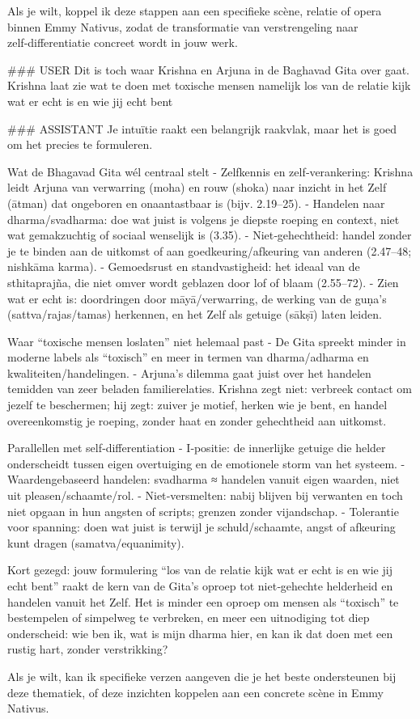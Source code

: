Als je wilt, koppel ik deze stappen aan een specifieke scène, relatie of opera binnen Emmy Nativus, zodat de transformatie van verstrengeling naar zelf‑differentiatie concreet wordt in jouw werk.

\#\#\# USER
Dit is toch waar Krishna en Arjuna in de Baghavad Gita over gaat. Krishna laat zie wat te doen met toxische mensen namelijk los van de relatie kijk wat er echt is en wie jij echt bent

\#\#\# ASSISTANT
Je intuïtie raakt een belangrijk raakvlak, maar het is goed om het precies te formuleren.

Wat de Bhagavad Gita wél centraal stelt
- Zelfkennis en zelf‑verankering: Krishna leidt Arjuna van verwarring (moha) en rouw (shoka) naar inzicht in het Zelf (ātman) dat ongeboren en onaantastbaar is (bijv. 2.19–25).
- Handelen naar dharma/svadharma: doe wat juist is volgens je diepste roeping en context, niet wat gemakzuchtig of sociaal wenselijk is (3.35).
- Niet‑gehechtheid: handel zonder je te binden aan de uitkomst of aan goedkeuring/afkeuring van anderen (2.47–48; nishkāma karma).
- Gemoedsrust en standvastigheid: het ideaal van de sthitaprajña, die niet omver wordt geblazen door lof of blaam (2.55–72).
- Zien wat er echt is: doordringen door māyā/verwarring, de werking van de guṇa’s (sattva/rajas/tamas) herkennen, en het Zelf als getuige (sākṣī) laten leiden.

Waar “toxische mensen loslaten” niet helemaal past
- De Gita spreekt minder in moderne labels als “toxisch” en meer in termen van dharma/adharma en kwaliteiten/handelingen.
- Arjuna’s dilemma gaat juist over het handelen temidden van zeer beladen familierelaties. Krishna zegt niet: verbreek contact om jezelf te beschermen; hij zegt: zuiver je motief, herken wie je bent, en handel overeenkomstig je roeping, zonder haat en zonder gehechtheid aan uitkomst.

Parallellen met self‑differentiation
- I‑positie: de innerlijke getuige die helder onderscheidt tussen eigen overtuiging en de emotionele storm van het systeem.
- Waardengebaseerd handelen: svadharma ≈ handelen vanuit eigen waarden, niet uit pleasen/schaamte/rol.
- Niet‑versmelten: nabij blijven bij verwanten en toch niet opgaan in hun angsten of scripts; grenzen zonder vijandschap.
- Tolerantie voor spanning: doen wat juist is terwijl je schuld/schaamte, angst of afkeuring kunt dragen (samatva/equanimity).

Kort gezegd: jouw formulering “los van de relatie kijk wat er echt is en wie jij echt bent” raakt de kern van de Gita’s oproep tot niet‑gehechte helderheid en handelen vanuit het Zelf. Het is minder een oproep om mensen als “toxisch” te bestempelen of simpelweg te verbreken, en meer een uitnodiging tot diep onderscheid: wie ben ik, wat is mijn dharma hier, en kan ik dat doen met een rustig hart, zonder verstrikking?

Als je wilt, kan ik specifieke verzen aangeven die je het beste ondersteunen bij deze thematiek, of deze inzichten koppelen aan een concrete scène in Emmy Nativus.
